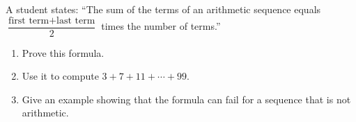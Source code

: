 A student states: ``The sum of the terms of an arithmetic sequence equals $\dfrac{\text{first term}+\text{last term}}{2}$ times the number of terms.''
\begin{enumerate}
\item[(a)] Prove this formula.
\item[(b)] Use it to compute $3+7+11+\cdots+99$.
\item[(c)] Give an example showing that the formula can fail for a sequence that is not arithmetic.
\end{enumerate}
